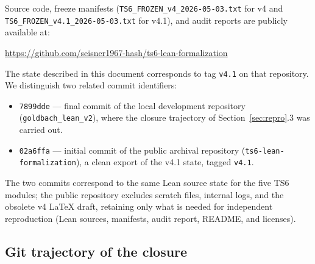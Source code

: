 \documentclass[11pt,a4paper]{article}
\theoremstyle{definition}
\begin{document}
Source code, freeze manifests (\texttt{TS6\_FROZEN\_v4\_2026-05-03.txt} for v4 and \texttt{TS6\_FROZEN\_v4.1\_2026-05-03.txt} for v4.1), and audit reports are publicly available at:
\begin{center}
\url{https://github.com/seisner1967-hash/ts6-lean-formalization}
\end{center}
The state described in this document corresponds to tag \verb|v4.1| on that repository. We distinguish two related commit identifiers:
\begin{itemize}[noitemsep]
\item \verb|7899dde| --- final commit of the local development repository (\texttt{goldbach\_lean\_v2}), where the closure trajectory of Section~\ref{sec:repro}.3 was carried out.
\item \verb|02a6ffa| --- initial commit of the public archival repository (\texttt{ts6-lean-formalization}), a clean export of the v4.1 state, tagged \verb|v4.1|.
\end{itemize}
The two commits correspond to the same Lean source state for the five TS6 modules; the public repository excludes scratch files, internal logs, and the obsolete v4 LaTeX draft, retaining only what is needed for independent reproduction (Lean sources, manifests, audit report, README, and licenses).

\subsection{Git trajectory of the closure}
\end{document}
